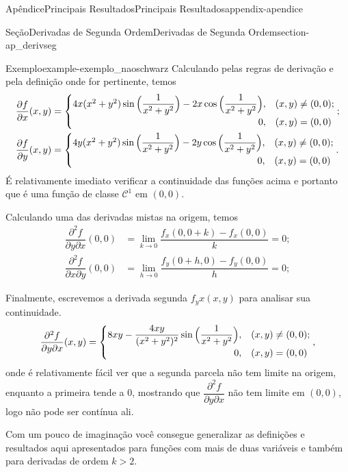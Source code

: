 \documentclass[oneside,10pt,]{book}
\numberwithin{equation}{section}
\begin{document}
\begin{appendixptx}{Apêndice}{Principais Resultados}{}{Principais Resultados}{}{}{appendix-apendice}
\begin{sectionptx}{Seção}{Derivadas de Segunda Ordem}{}{Derivadas de Segunda Ordem}{}{}{section-ap_derivseg}
\begin{example}{Exemplo}{}{example-exemplo_naoschwarz}
Calculando pelas regras de derivação e pela definição onde for pertinente, temos%
\begin{align*}
\dfrac{\partial f}{\partial x}(x,y)
&=\begin{cases}4x(x^2+y^2)\sin\Big(\dfrac{1}{x^2+y^2}\Big)-
2x\cos\Big(\dfrac{1}{x^2+y^2}\Big),&(x,y)\neq
(0,0);\\ \hfill 0,& (x,y)=(0,0)\end{cases};\\
\dfrac{\partial f}{\partial y}(x,y)
&=\begin{cases}4y(x^2+y^2)\sin\Big(\dfrac{1}{x^2+y^2}\Big)-
2y\cos\Big(\dfrac{1}{x^2+y^2}\Big),&(x,y)\neq
(0,0);\\ \hfill 0,& (x,y)=(0,0)\end{cases}.
\end{align*}
É relativamente imediato verificar a continuidade das funções acima e portanto que é uma função de classe \(\mathscr{C}^1\) em \((0,0)\).%
\par
Calculando uma das derivadas mistas na origem, temos%
\begin{align*}
\dfrac{\partial^2 f}{\partial y\partial x}(0,0)
&=\lim\limits_{k\to 0}\dfrac{f_x(0,0+k)-f_x(0,0)}{k}=0;\\
\dfrac{\partial^2 f}{\partial x\partial y}(0,0)
&=\lim\limits_{h\to 0}\dfrac{f_y(0+h,0)-f_y(0,0)}{h}=0;
\end{align*}
%
\par
Finalmente, escrevemos a derivada segunda \(f_yx(x,y)\) para analisar sua continuidade.%
\begin{equation*}
\dfrac{\partial^2 f}{\partial
y\partial x}(x,y)= \begin{cases}
8xy-\dfrac{4xy}{(x^2+y^2)^2}\sin\Big(\dfrac{1}{x^2+y^2}\Big),&(x,y)\neq
(0,0);\\ \hfill 0,& (x,y)=(0,0) \end{cases},
\end{equation*}
onde é relativamente fácil ver que a segunda parcela não tem limite na origem, enquanto a primeira tende a \(0\), mostrando que \(\dfrac{\partial^2 f}{\partial y\partial x}\) não tem limite em \((0,0)\), logo não pode ser contínua ali.%
\end{example}
Com um pouco de imaginação você consegue generalizar as definições e resultados aqui apresentados para funções com mais de duas variáveis e também para derivadas de ordem \(k> 2\).%
\end{sectionptx}
%
%
\typeout{************************************************}

\end{appendixptx}
\end{document}

